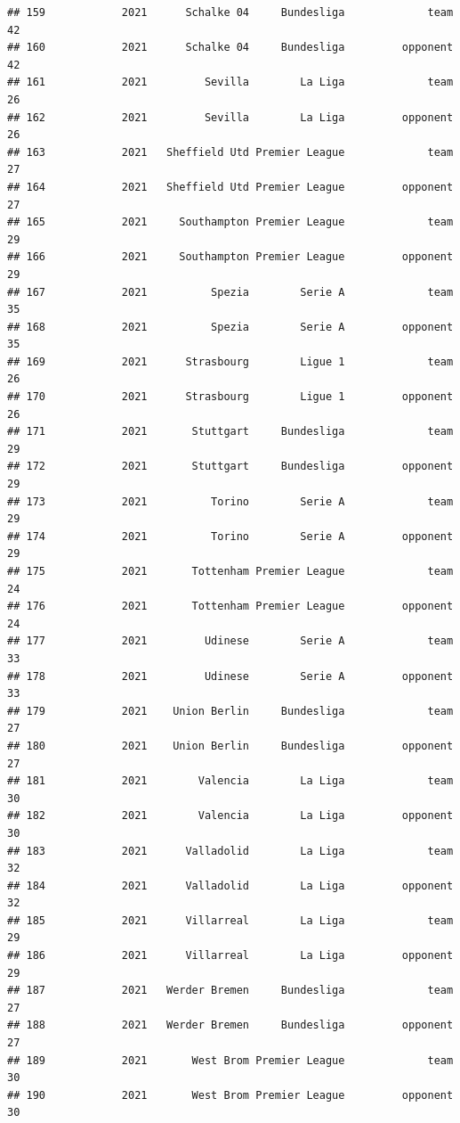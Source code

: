 \documentclass[
]{book}
\theoremstyle{definition}
\theoremstyle{definition}
\theoremstyle{definition}
\theoremstyle{definition}
\theoremstyle{remark}
\begin{document}
\begin{verbatim}
## 159            2021      Schalke 04     Bundesliga             team          42
## 160            2021      Schalke 04     Bundesliga         opponent          42
## 161            2021         Sevilla        La Liga             team          26
## 162            2021         Sevilla        La Liga         opponent          26
## 163            2021   Sheffield Utd Premier League             team          27
## 164            2021   Sheffield Utd Premier League         opponent          27
## 165            2021     Southampton Premier League             team          29
## 166            2021     Southampton Premier League         opponent          29
## 167            2021          Spezia        Serie A             team          35
## 168            2021          Spezia        Serie A         opponent          35
## 169            2021      Strasbourg        Ligue 1             team          26
## 170            2021      Strasbourg        Ligue 1         opponent          26
## 171            2021       Stuttgart     Bundesliga             team          29
## 172            2021       Stuttgart     Bundesliga         opponent          29
## 173            2021          Torino        Serie A             team          29
## 174            2021          Torino        Serie A         opponent          29
## 175            2021       Tottenham Premier League             team          24
## 176            2021       Tottenham Premier League         opponent          24
## 177            2021         Udinese        Serie A             team          33
## 178            2021         Udinese        Serie A         opponent          33
## 179            2021    Union Berlin     Bundesliga             team          27
## 180            2021    Union Berlin     Bundesliga         opponent          27
## 181            2021        Valencia        La Liga             team          30
## 182            2021        Valencia        La Liga         opponent          30
## 183            2021      Valladolid        La Liga             team          32
## 184            2021      Valladolid        La Liga         opponent          32
## 185            2021      Villarreal        La Liga             team          29
## 186            2021      Villarreal        La Liga         opponent          29
## 187            2021   Werder Bremen     Bundesliga             team          27
## 188            2021   Werder Bremen     Bundesliga         opponent          27
## 189            2021       West Brom Premier League             team          30
## 190            2021       West Brom Premier League         opponent          30

\end{verbatim}
\end{document}
